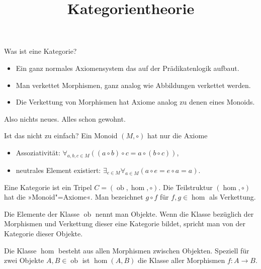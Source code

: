 \documentclass[9pt]{beamer}
\title{Kategorientheorie}
\date{}
\newcommand{\ob}{\operatorname{ob}}
\begin{document}
\begin{frame}
\maketitle
\end{frame}

\begin{frame}
Was ist eine Kategorie?
\end{frame}

\begin{frame}
\begin{itemize}
\item Ein ganz normales Axiomensystem das auf der Prädikatenlogik aufbaut.
\item Man verkettet Morphismen, ganz analog wie Abbildungen
  verkettet werden.
\item Die Verkettung von Morphismen hat Axiome analog zu denen
  eines Monoids.
\end{itemize}
\end{frame}

\begin{frame}
Also nichts neues. Alles schon gewohnt.
\end{frame}

\begin{frame}
Ist das nicht zu einfach? Ein Monoid $(M,\circ)$ hat nur die Axiome
\begin{itemize}
\item Assoziativität: $\forall_{a,b,c{\in}M}((a\circ b)\circ c = a\circ (b\circ c))$,
\item neutrales Element existiert: $\exists_{e\in M}\forall_{a\in M}(a\circ e = e\circ a = a)$.
\end{itemize}
\end{frame}

\begin{frame}
Eine Kategorie ist ein Tripel $C=(\operatorname{ob},\hom,\circ)$.
Die Teilstruktur $(\hom,\circ)$ hat die »Monoid"=Axiome«.
Man bezeichnet $g\circ f$ für $f,g\in\hom$ als Verkettung.

\vspace{1em}
Die Elemente der Klasse $\ob$ nennt man Objekte.
Wenn die Klasse bezüglich der Morphismen und Verkettung dieser
eine Kategorie bildet, spricht man von der Kategorie dieser Objekte.
\end{frame}

\begin{frame}
Die Klasse $\hom$ besteht aus allen Morphismen zwischen Objekten.
Speziell für zwei Objekte $A,B\in\ob$ ist $\hom(A,B)$ die Klasse
aller Morphismen $f\colon A\to B$.
\end{frame}
\end{document}
